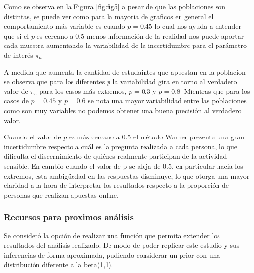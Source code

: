 \documentclass[
]{article}
\begin{document}
Como se observa en la Figura \ref{fig:fig5} a pesar de que las poblaciones son distintas, se puede ver como para la mayoria de graficos en general el comportamiento más variable es cuando \(p = 0.45\) lo cual nos ayuda a entender que si el \(p\) es cercano a 0.5 menos información de la realidad nos puede aportar cada muestra aumentando la variabilidad de la incertidumbre para el parámetro de interés \(\pi_a\)

A medida que aumenta la cantidad de estudaintes que apuestan en la poblacion se observa que para los diferentes \(p\) la variabilidad gira en torno al verdadero valor de \(\pi_a\) para los casos más extremos, \(p = 0.3\) y \(p = 0.8\). Mientras que para los casos de \(p = 0.45\) y \(p = 0.6\) se nota una mayor variabilidad entre las poblaciones como son muy variables no podemos obtener una buena precisión al verdadero valor.

Cuando el valor de \(p\) es más cercano a 0.5 el método Warner presenta una gran incertidumbre respecto a cuál es la pregunta realizada a cada persona, lo que dificulta el discernimiento de quiénes realmente participan de la actividad sensible. En cambio cuando el valor de p se aleja de 0.5, en particular hacia los extremos, esta ambigüedad en las respuestas disminuye, lo que otorga una mayor claridad a la hora de interpretar los resultados respecto a la proporción de personas que realizan apuestas online.

\subsubsection{Recursos para proximos análisis}\label{subtitulo-9}

Se consideró la opción de realizar una función que permita extender los resultados del análisis realizado. De modo de poder replicar este estudio y sus inferencias de forma aproximada, pudiendo considerar un prior con una distribución diferente a la beta(1,1).
\end{document}
